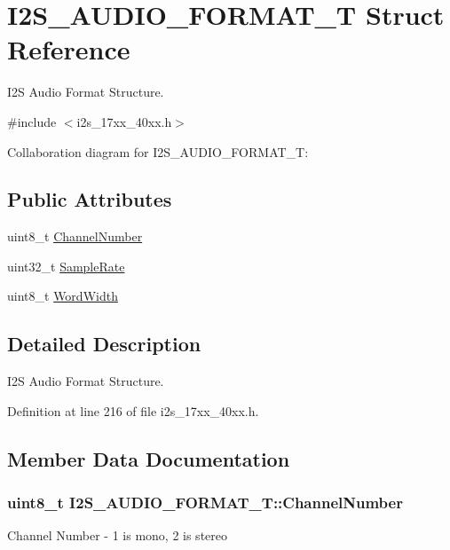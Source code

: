\hypertarget{structI2S__AUDIO__FORMAT__T}{}\section{I2\+S\+\_\+\+A\+U\+D\+I\+O\+\_\+\+F\+O\+R\+M\+A\+T\+\_\+T Struct Reference}
\label{structI2S__AUDIO__FORMAT__T}


I2S Audio Format Structure.  




{\ttfamily \#include $<$i2s\+\_\+17xx\+\_\+40xx.\+h$>$}



Collaboration diagram for I2\+S\+\_\+\+A\+U\+D\+I\+O\+\_\+\+F\+O\+R\+M\+A\+T\+\_\+T\+:
\subsection*{Public Attributes}
\begin{DoxyCompactItemize}
\item 
uint8\+\_\+t \hyperlink{structI2S__AUDIO__FORMAT__T_ad9856c3cfc176a9c5f25851dda4d848d}{Channel\+Number}
\item 
uint32\+\_\+t \hyperlink{structI2S__AUDIO__FORMAT__T_aef370fad5b70b5226a2f8a780bd934d9}{Sample\+Rate}
\item 
uint8\+\_\+t \hyperlink{structI2S__AUDIO__FORMAT__T_a5b21d5d739e0eb7e66c898618fcd4605}{Word\+Width}
\end{DoxyCompactItemize}


\subsection{Detailed Description}
I2S Audio Format Structure. 

Definition at line 216 of file i2s\+\_\+17xx\+\_\+40xx.\+h.



\subsection{Member Data Documentation}
\subsubsection[{\texorpdfstring{Channel\+Number}{ChannelNumber}}]{\setlength{\rightskip}{0pt plus 5cm}uint8\+\_\+t I2\+S\+\_\+\+A\+U\+D\+I\+O\+\_\+\+F\+O\+R\+M\+A\+T\+\_\+\+T\+::\+Channel\+Number}\hypertarget{structI2S__AUDIO__FORMAT__T_ad9856c3cfc176a9c5f25851dda4d848d}{}\label{structI2S__AUDIO__FORMAT__T_ad9856c3cfc176a9c5f25851dda4d848d}
Channel Number -\/ 1 is mono, 2 is stereo 

